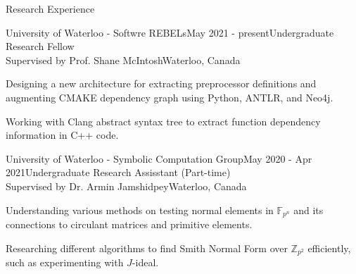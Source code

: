\documentclass{cv}
\begin{document}
\begin{rSection}{Research Experience}
\begin{rSubsection}{University of Waterloo - Softwre REBELs}{May 2021 - present}{Undergraduate Research Fellow \\ Supervised by Prof. Shane McIntosh}{Waterloo, Canada}
	\item Designing a new architecture for extracting preprocessor definitions and augmenting CMAKE dependency graph
	using Python, ANTLR, and Neo4j.
	\item Working with Clang abstract syntax tree to extract function dependency information in C++ code.
\end{rSubsection}

\begin{rSubsection}{University of Waterloo - Symbolic Computation Group}{May 2020 - Apr 2021}{Undergraduate Research Assisstant (Part-time)\\ Supervised by Dr. Armin Jamshidpey}{Waterloo, Canada}
    \item Understanding various methods on testing normal elements in $\mathbb{F}_{p^n}$ and its connections to circulant matrices and primitive elements.
  	\item Researching different algorithms to find Smith Normal Form over $\mathbb{Z}_{p^2}$ efficiently, such as experimenting with $J$-ideal.
\end{rSubsection}
\end{rSection}
\end{document}

